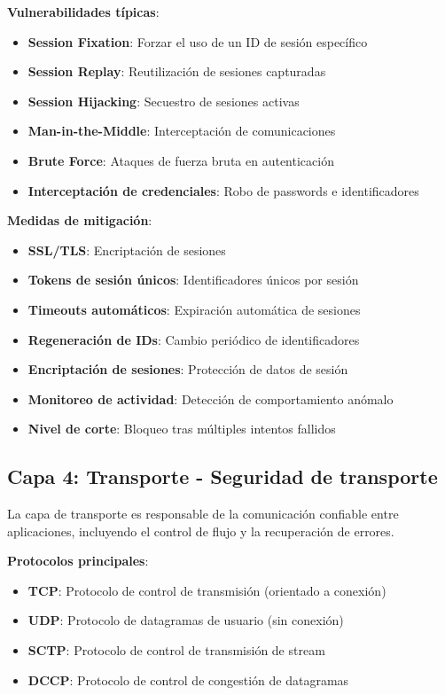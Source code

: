 \textbf{Vulnerabilidades típicas}:
\begin{itemize}
    \item \textbf{Session Fixation}: Forzar el uso de un ID de sesión específico
    \item \textbf{Session Replay}: Reutilización de sesiones capturadas
    \item \textbf{Session Hijacking}: Secuestro de sesiones activas
    \item \textbf{Man-in-the-Middle}: Interceptación de comunicaciones
    \item \textbf{Brute Force}: Ataques de fuerza bruta en autenticación
    \item \textbf{Interceptación de credenciales}: Robo de passwords e identificadores
\end{itemize}

\textbf{Medidas de mitigación}:
\begin{itemize}
    \item \textbf{SSL/TLS}: Encriptación de sesiones
    \item \textbf{Tokens de sesión únicos}: Identificadores únicos por sesión
    \item \textbf{Timeouts automáticos}: Expiración automática de sesiones
    \item \textbf{Regeneración de IDs}: Cambio periódico de identificadores
    \item \textbf{Encriptación de sesiones}: Protección de datos de sesión
    \item \textbf{Monitoreo de actividad}: Detección de comportamiento anómalo
    \item \textbf{Nivel de corte}: Bloqueo tras múltiples intentos fallidos
\end{itemize}

\subsection{Capa 4: Transporte - Seguridad de transporte}

La capa de transporte es responsable de la comunicación confiable entre aplicaciones, incluyendo el control de flujo y la recuperación de errores.

\textbf{Protocolos principales}:
\begin{itemize}
    \item \textbf{TCP}: Protocolo de control de transmisión (orientado a conexión)
    \item \textbf{UDP}: Protocolo de datagramas de usuario (sin conexión)
    \item \textbf{SCTP}: Protocolo de control de transmisión de stream
    \item \textbf{DCCP}: Protocolo de control de congestión de datagramas
\end{itemize}

